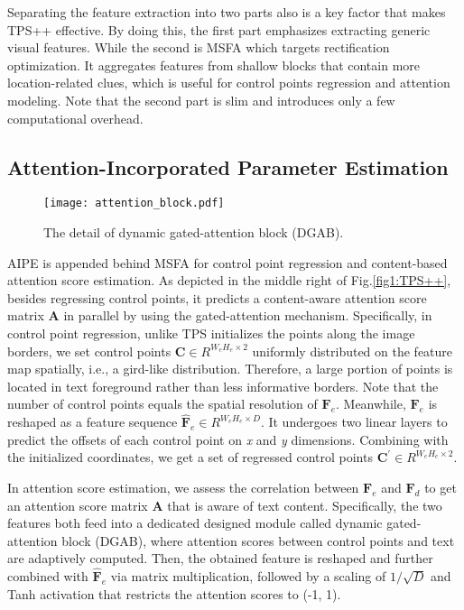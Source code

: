 \documentclass{article}
\begin{document}
Separating the feature extraction into two parts also is a key factor that makes TPS++ effective. By doing this, the first part emphasizes extracting generic visual features. While the second is MSFA which targets rectification optimization. It aggregates features from shallow blocks that contain more location-related clues, which is useful for control points regression and attention modeling. Note that the second part is slim and introduces only a few computational overhead.


\subsection{Attention-Incorporated Parameter Estimation}

\begin{figure}[t]
\centering
\texttt{[image:  attention\_block.pdf]} \caption{The detail of dynamic gated-attention block (DGAB).}
\label{fig1:motivation}
\end{figure}


AIPE is appended behind MSFA for control point regression and content-based attention score estimation. As depicted in the middle right of Fig.\ref{fig1:TPS++}, besides regressing control points, it predicts a content-aware attention score matrix $\boldsymbol{A}$ in parallel by using the gated-attention mechanism. Specifically, in control point regression, unlike TPS initializes the points along the image borders, we set control points ${\boldsymbol{C}} \in R^{W_{e}H_{e}\times 2}$ uniformly distributed on the feature map spatially, i.e., a gird-like distribution. Therefore, a large portion of points is located in text foreground rather than less informative borders. Note that the number of control points equals the spatial resolution of $\boldsymbol{F}_{e}$. Meanwhile, $\boldsymbol{F}_{e}$ is reshaped as a feature sequence $\boldsymbol{\hat{F}}_{e} \in R^{W_{e}H_{e}\times D}$. It undergoes two linear layers to predict the offsets of each control point on \emph{x} and \emph{y} dimensions. Combining with the initialized coordinates, we get a set of regressed control points ${\boldsymbol{C}^\prime} \in R^{W_{e}H_{e}\times 2}$.

In attention score estimation, we assess the correlation between $\boldsymbol{F}_{e}$ and $\boldsymbol{F}_{d}$ to get an attention score matrix $\boldsymbol{A}$ that is aware of text content. Specifically, the two features both feed into a dedicated designed module called dynamic gated-attention block (DGAB), where attention scores between control points and text are adaptively computed. Then, the obtained feature is reshaped and further combined with $\boldsymbol{\hat{F}}_{e}$ via matrix multiplication, followed by a scaling of $1/\sqrt{D}$ and Tanh activation that restricts the attention scores to (-1, 1).
\end{document}
